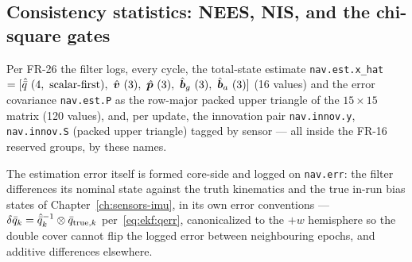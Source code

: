 \subsection{Consistency statistics: NEES, NIS, and the chi-square
gates}
\label{sec:ekf:consistency}

Per FR-26 the filter logs, every cycle, the total-state estimate
\texttt{nav.est.x\_hat} $= [\hat{\quat{q}}\ (4,\ \text{scalar-first}),\
\hat{\vv{v}}\ (3),\ \hat{\vv{p}}\ (3),\ \hat{\vv{b}}_g\ (3),\
\hat{\vv{b}}_a\ (3)]$ (16 values) and the error covariance
\texttt{nav.est.P} as the row-major packed upper triangle of the
$15 \times 15$ matrix (120 values), and, per update, the innovation
pair \texttt{nav.innov.y}, \texttt{nav.innov.S} (packed upper triangle)
tagged by sensor --- all inside the FR-16 reserved groups, by these
names.

The estimation error itself is formed core-side and logged on
\texttt{nav.err}: the filter differences its nominal state against the
truth kinematics and the true in-run bias states of
Chapter~\ref{ch:sensors-imu}, in its own error conventions ---
$\delta\bar{q}_k = \hat{\bar{q}}_k^{-1} \otimes
\bar{q}_{\mathrm{true},k}$ per~\eqref{eq:ekf:qerr}, canonicalized to the
$+w$ hemisphere so the double cover cannot flip the logged error between
neighbouring epochs, and additive differences elsewhere.

